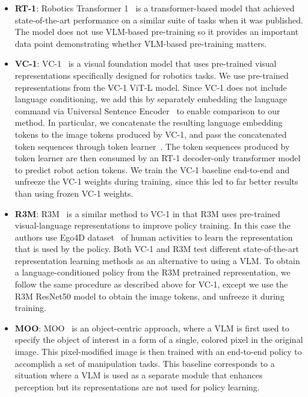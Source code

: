 \begin{itemize}
    \item \textbf{RT-1}: Robotics Transformer 1~\cite{brohan2022rt} is a transformer-based model that achieved state-of-the-art performance on a similar suite of tasks when it was published. The model does not use VLM-based pre-training so it provides an important data point demonstrating whether VLM-based pre-training matters.
    \item \textbf{VC-1}: VC-1~\cite{majumdar2023vc1} is a visual foundation model that uses pre-trained visual representations specifically designed for robotics tasks. We use pre-trained representations from the VC-1 ViT-L model. Since VC-1 does not include language conditioning, we add this by separately embedding the language command via Universal Sentence Encoder~\cite{kona2018cer} to enable comparison to our method. In particular, we concatenate the resulting language embedding tokens to the image tokens produced by VC-1, and pass the concatenated token sequences through token learner~\cite{ryoo2021tokenlearner}. The token sequences produced by token learner are then consumed by an RT-1 decoder-only transformer model to predict robot action tokens. We train the VC-1 baseline end-to-end and unfreeze the VC-1 weights during training, since this led to far better results than using frozen VC-1 weights.
    \item \textbf{R3M}: R3M~\cite{nair2022r3m} is a similar method to VC-1 in that R3M uses pre-trained visual-language representations to improve policy training. In this case the authors use Ego4D dataset~\cite{grauman2022ego4d} of human activities to learn the representation that is used by the policy. Both VC-1 and R3M test different state-of-the-art representation learning methods as an alternative to using a VLM. To obtain a language-conditioned policy from the R3M pretrained representation, we follow the same procedure as described above for VC-1, except we use the R3M ResNet50 model to obtain the image tokens, and unfreeze it during training.
    \item \textbf{MOO}: MOO~\cite{stone2023open} is an object-centric approach, where a VLM is first used to specify the object of interest in a form of a single, colored pixel in the original image. This pixel-modified image is then trained with an end-to-end policy to accomplish a set of manipulation tasks. This baseline corresponds to a situation where a VLM is used as a separate module that enhances perception but its representations are not used for policy learning.
\end{itemize}

